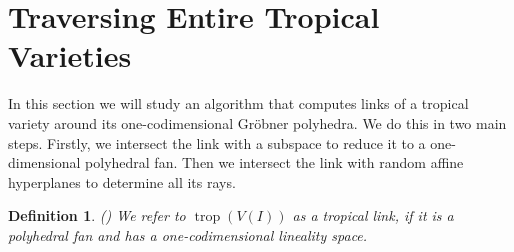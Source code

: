 \documentclass[11pt,reqno,a4paper]{article}
\theoremstyle{theoremstyle}
\theoremstyle{examplestyle}
\newtheorem{definition}[theorem]{Definition}
\theoremstyle{algorithmstyle}
\numberwithin{equation}{subsection}
\DeclareMathOperator{\trop}{trop}
\begin{document}
\section{Traversing Entire Tropical Varieties}
In this section we will study an algorithm  \cite[Algorithm 4.6]{HR2018} that computes links of a tropical variety around its one-codimensional Gröbner polyhedra. We do this in two main steps. Firstly, we intersect the link with a subspace to reduce it to a one-dimensional polyhedral fan. Then we intersect the link with random affine hyperplanes to determine all its rays.

\begin{definition}
    (\cite[Def. 4.1]{HR2018}) We refer to $\trop(V(I))$ as a tropical link, if it is a polyhedral fan and has a one-codimensional lineality space.
\end{definition}
\end{document}

